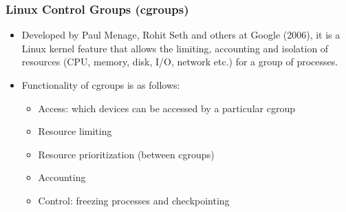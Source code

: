 \documentclass{article}
\begin{document}
\subsubsection{Linux Control Groups (cgroups)}
\begin{itemize}
    \item Developed by Paul Menage, Rohit Seth and others at Google (2006), it is a Linux kernel feature that allows the limiting, accounting and isolation of resources (CPU, memory, disk, I/O, network etc.) for a group of processes.
    
    \item Functionality of cgroups is as follows:
    \begin{itemize}
        \item Access: which devices can be accessed by a particular cgroup
        
        \item Resource limiting 
        
        \item Resource prioritization (between cgroups)
        
        \item Accounting
        
        \item Control: freezing processes and checkpointing
    \end{itemize}
\end{itemize}
\end{document}

